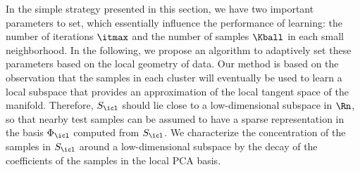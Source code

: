 \documentclass[journal]{IEEEtran}
\begin{document}
In the simple strategy presented in this section, we have two important parameters to set, which essentially influence the performance of learning: the number of iterations $\itmax$ and the number of samples $\Kball$ in each small neighborhood. In the following, we propose an algorithm to adaptively set these parameters based on the local geometry of data. Our method is based on the observation that the samples in each cluster will eventually be used to learn a local subspace that provides an approximation of the local tangent space of the manifold. Therefore,  $S_\icl$ should lie close to a low-dimensional subspace in $\Rn$, so that nearby test samples  can be assumed to have a sparse representation in the basis $\Phi_\icl$ computed from $S_\icl$. We characterize the concentration of the samples in $S_\icl$ around  a low-dimensional subspace by the decay of the coefficients of the samples in the local PCA basis. 

 
\end{document}
